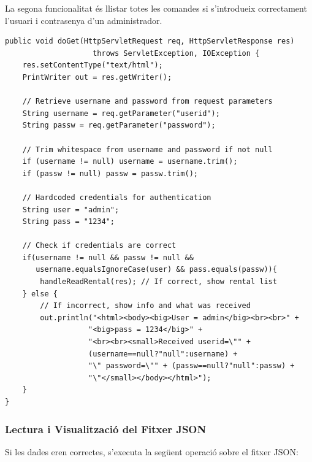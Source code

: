 \documentclass[12pt,a4paper]{article}
\begin{document}
La segona funcionalitat és llistar totes les comandes si s'introdueix correctament l'usuari i contrasenya d'un administrador.

\begin{lstlisting}[style=javastyle,caption=Autenticació en CarRentalList]
public void doGet(HttpServletRequest req, HttpServletResponse res)
                    throws ServletException, IOException {
    res.setContentType("text/html");
    PrintWriter out = res.getWriter();
    
    // Retrieve username and password from request parameters
    String username = req.getParameter("userid");
    String passw = req.getParameter("password");

    // Trim whitespace from username and password if not null
    if (username != null) username = username.trim();
    if (passw != null) passw = passw.trim();

    // Hardcoded credentials for authentication
    String user = "admin";
    String pass = "1234";
    
    // Check if credentials are correct
    if(username != null && passw != null && 
       username.equalsIgnoreCase(user) && pass.equals(passw)){
        handleReadRental(res); // If correct, show rental list
    } else {
        // If incorrect, show info and what was received
        out.println("<html><body><big>User = admin</big><br><br>" +
                   "<big>pass = 1234</big>" +
                   "<br><br><small>Received userid=\"" + 
                   (username==null?"null":username) + 
                   "\" password=\"" + (passw==null?"null":passw) + 
                   "\"</small></body></html>");
    }
}
\end{lstlisting}

\newpage
\subsubsection{Lectura i Visualització del Fitxer JSON}

Si les dades eren correctes, s'executa la següent operació sobre el fitxer JSON:
\end{document}
